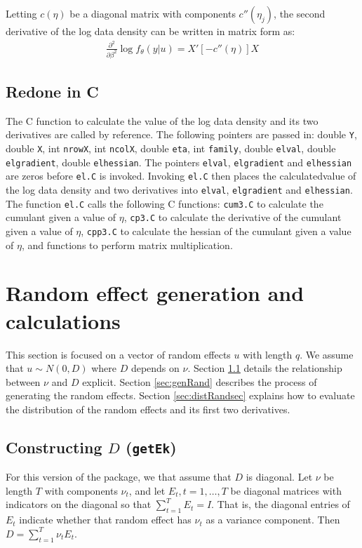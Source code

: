 \documentclass{article}
\begin{document}
Letting $ c(\eta)$ be a diagonal matrix with components $c''(\eta_j)$, the second derivative of the log data density can be written in matrix form as:
\begin{align}
   \frac{\partial^2}{\partial \beta^2} \log f_\theta(y|u) =   X' [ -  c''(\eta) ] X
\end{align}

\subsection{Redone in C}
The C function to calculate the value of the log data density and its two derivatives are called by reference. The following pointers are passed in: double \texttt{Y}, double \texttt{X}, int \texttt{nrowX}, int \texttt{ncolX}, double \texttt{eta}, int \texttt{family}, double \texttt{elval}, double \texttt{elgradient}, double \texttt{elhessian}. The pointers  \texttt{elval}, \texttt{elgradient} and \texttt{elhessian} are zeros before \texttt{el.C} is invoked. Invoking \texttt{el.C}  then places the calculatedvalue of the log data density and two derivatives into \texttt{elval}, \texttt{elgradient} and \texttt{elhessian}.\\

The function \texttt{el.C} calls the following C functions: \texttt{cum3.C} to calculate the cumulant given a value of $\eta$, \texttt{cp3.C} to calculate the derivative of the cumulant given a value of $\eta$, \texttt{cpp3.C} to calculate the hessian of the cumulant given a value of $\eta$, and functions to perform matrix multiplication.


\section{Random effect generation and calculations}
This section is focused on a vector of random effects $u$ with length $q$. We assume that $u \sim N(0,D)$ where $D$ depends on $\nu$. Section \ref{sec:getEk} details the  relationship between  $\nu$ and $D$ explicit. Section \ref{sec:genRand} describes the process of generating the random effects. Section \ref{sec:distRandsec} explains how to evaluate the distribution of the random effects and its first two derivatives.

\subsection{Constructing $D$ (\texttt{getEk})}\label{sec:getEk}
For this version of the package, we that assume that $D$ is diagonal.  Let $\nu$ be length $T$ with components $\nu_t$, and let $E_t,t=1,\ldots,T$ be diagonal matrices with indicators on the diagonal so that $\sum_{t=1}^T E_t = I$. That is, the diagonal entries  of $E_t$ indicate whether that random effect has $\nu_t$ as a variance component. Then $D=\sum_{t=1}^T\nu_t  E_t $.  
\end{document}
